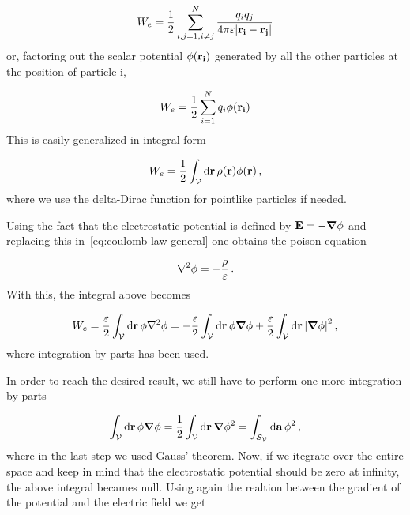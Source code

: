 \documentclass[12pt, class=report, crop=false]{standalone}
\begin{document}
\begin{equation*}
  W_{e} = \frac{1}{2} \sum_{i,j=1, i\neq j}^{N} \frac{q_{i} q_{j}}{4 \pi \varepsilon \abs{\vb{r_{i}}-\vb{r_{j}}}}
\end{equation*}
or, factoring out the scalar potential \(\phi (\vb{r_{i}})\) generated by all the other particles at the position of particle i,

\begin{equation*}
  W_{e} = \frac{1}{2} \sum_{i=1}^{N} q_{i} \phi (\vb{r_{i}})
\end{equation*}
This is easily generalized in integral form

\begin{equation*}
  W_{e} = \frac{1}{2} \int_\mathcal{V} \dd{\vb{r}} \rho (\vb{r}) \phi (\vb{r}) \, ,
\end{equation*}
where we use the delta-Dirac function for pointlike particles if needed.

\par
Using the fact that the electrostatic potential is defined by \(\vb{E} = - \grad{\phi}\) and replacing this in~\cref{eq:coulomb-law-general} one obtains the poison equation

\begin{equation}
 \label{eq:poisson}
 \laplacian{\phi} = - \frac{\rho}{\varepsilon} \,.
\end{equation}
With this, the integral above becomes

\begin{equation*}
  W_{e} = \frac{\varepsilon}{2} \int_\mathcal{V} \dd{\vb{r}} \phi \laplacian{\phi} = - \frac{\varepsilon}{2} \int_\mathcal{V} \dd{\vb{r}} \phi \grad{\phi} + \frac{\varepsilon}{2} \int_\mathcal{V} \dd{\vb{r}} \abs{\grad{\phi}}^{2} \, ,
\end{equation*}
where integration by parts has been used.

\par
In order to reach the desired result, we still have to perform one more integration by parts

\begin{equation*}
  \int_\mathcal{V} \dd{\vb{r}} \phi \grad{\phi} = \frac{1}{2} \int_\mathcal{V} \dd{\vb{r}} \grad{\phi^2} = \int_{\mathcal{S}_{\mathcal{V}}} \dd{\vb{a}} \phi^{2} \, ,
\end{equation*}
where in the last step we used Gauss' theorem. Now, if we itegrate over the entire space and keep in mind that the electrostatic potential should be zero at infinity, the above integral becames null. Using again the realtion between the gradient of the potential and the electric field we get
\end{document}
